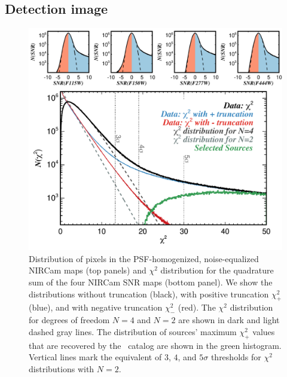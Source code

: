 \documentclass[longauth]{aa}
\begin{document}
\subsection{Detection image} \label{sec:detection-image}

\begin{figure}[t!]
\includegraphics[width=0.99\columnwidth]{figures/chi2dist.pdf}
\caption{Distribution of pixels in the PSF-homogenized, noise-equalized NIRCam maps (top panels) and $\chi^2$ distribution for the quadrature sum of the four NIRCam SNR maps (bottom panel). We show the distributions without truncation (black), with positive truncation $\chi^2_+$ (blue), and with negative truncation $\chi^2_-$ (red).  The $\chi^2$ distribution for degrees of freedom $N=4$ and $N=2$ are shown in dark and light dashed gray lines.  The distribution of sources' maximum $\chi^2_+$ values that are recovered by the \hotcold\ catalog are shown in the green histogram. Vertical lines mark the equivalent of $3$, $4$, and $5\sigma$ thresholds for $\chi^2$ distributions with $N=2$.}
\label{fig:chi2}
\end{figure}
\end{document}
